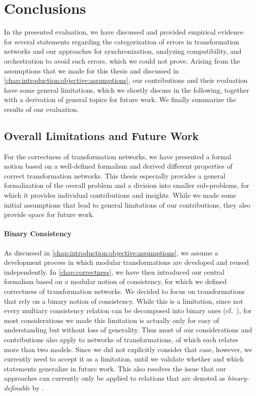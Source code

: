 \section{Conclusions}

In the presented evaluation, we have discussed and provided empirical evidence for several statements regarding the categorization of errors in transformation networks and our approaches for synchronization, analyzing compatibility, and orchestration to avoid such errors, which we could not prove.
Arising from the assumptions that we made for this thesis and discussed in \autoref{chap:introduction:objective:assumptions}, our contributions and their evaluation have some general limitations, which we shortly discuss in the following, together with a derivation of general topics for future work.
We finally summarize the results of our evaluation.


\subsection{Overall Limitations and Future Work}

For the correctness of transformation networks, we have presented a formal notion based on a well-defined formalism and derived different properties of correct transformation networks.
This thesis especially provides a general formalization of the overall problem and a division into smaller sub-problems, for which it provides individual contributions and insights.
While we made some initial assumptions that lead to general limitations of our contributions, they also provide space for future work.

\paragraph{Binary Consistency}
As discussed in \autoref{chap:introduction:objective:assumptions}, we assume a development process in which modular transformations are developed and reused independently.
In \autoref{chap:correctness}, we have then introduced our central formalism based on a modular notion of consistency, for which we defined correctness of transformation networks.
We decided to focus on transformations that rely on a binary notion of consistency.
While this is a limitation, since not every multiary consistency relation can be decomposed into binary ones (cf.~\cite{stevens2020BidirectionalTransformationLarge-SoSym}), for most considerations we made this limitation is actually only for easy of understanding but without loss of generality.
Thus most of our considerations and contributions also apply to networks of transformations, of which each relates more than two models.
Since we did not explicitly consider that case, however, we currently need to accept it as a limitation, until we validate whether and which statements generalize in future work.
This also resolves the issue that our approaches can currently only be applied to relations that are denoted as \emph{binary-definable} by \textcite{stevens2020BidirectionalTransformationLarge-SoSym}.

